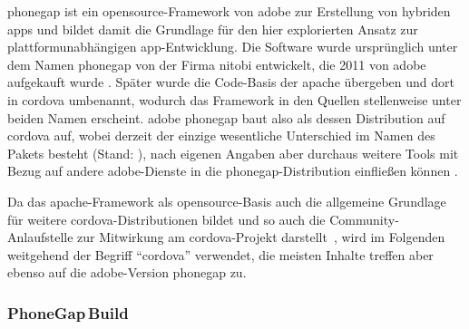 \gls{phonegap} ist ein \gls{opensource}-Framework von \gls{adobe} zur Erstellung von hybriden \glspl{app} und bildet damit die Grundlage für den hier explorierten Ansatz zur plattformunabhängigen \gls{app}-Entwicklung.
Die Software wurde ursprünglich unter dem Namen \gls{phonegap} von der Firma \gls{nitobi} entwickelt, die 2011 von \gls{adobe} aufgekauft wurde \cite{Adobe_Announces_Agreement_to_Acquire_Nitobi_Creator_of_PhoneGap}. 
Später wurde die Code-Basis der \gls{apache} übergeben und dort in \gls{cordova} umbenannt, wodurch das Framework in den Quellen stellenweise unter beiden Namen erscheint.
\Gls{adobe} \gls{phonegap} baut also als dessen Distribution auf \gls{cordova} auf, wobei derzeit der einzige wesentliche Unterschied im Namen des Pakets besteht (Stand: ), nach eigenen Angaben aber durchaus weitere Tools mit Bezug auf andere \gls{adobe}-Dienste in die \gls{phonegap}-Distribution einfließen können \cite{PhoneGap_Cordova_and_whats_in_a_name}.

Da das \gls{apache}-Framework als \gls{opensource}-Basis auch die allgemeine Grundlage für weitere \gls{cordova}-Distributionen bildet und so auch die Community-Anlaufstelle zur Mitwirkung am \gls{cordova}-Projekt darstellt~\cite{PhoneGap_Cordova_and_whats_in_a_name}, wird im Folgenden weitgehend der Begriff \enquote{\gls{cordova}} verwendet, die meisten Inhalte treffen aber ebenso auf die \gls{adobe}-Version \gls{phonegap} zu.





\subsubsection{PhoneGap\,Build}


